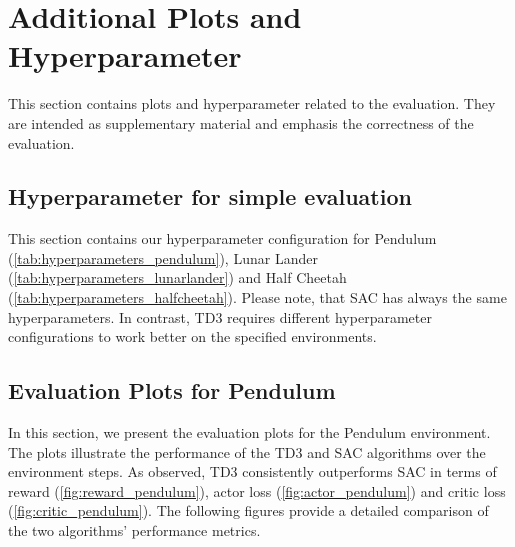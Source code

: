\appendix


\newpage


\newpage
\section{Additional Plots and Hyperparameter}

This section contains plots and hyperparameter related to the evaluation. They are intended as supplementary material and emphasis the correctness of the evaluation.

\subsection{Hyperparameter for simple evaluation} \label{sec:hyper_simple}

This section contains our hyperparameter configuration for Pendulum (\autoref{tab:hyperparameters_pendulum}), Lunar Lander (\autoref{tab:hyperparameters_lunarlander}) and Half Cheetah (\autoref{tab:hyperparameters_halfcheetah}). Please note, that \ac{SAC} has always the same hyperparameters. In contrast, \ac{TD3} requires different hyperparameter configurations to work better on the specified environments.


\newpage
\subsection{Evaluation Plots for Pendulum} \label{sec:simple_plots}

In this section, we present the evaluation plots for the Pendulum environment. The plots illustrate the performance of the \ac{TD3} and \ac{SAC} algorithms over the environment steps. As observed, \ac{TD3} consistently outperforms \ac{SAC} in terms of reward (\autoref{fig:reward_pendulum}), actor loss (\autoref{fig:actor_pendulum}) and critic loss (\autoref{fig:critic_pendulum}). The following figures provide a detailed comparison of the two algorithms' performance metrics.

